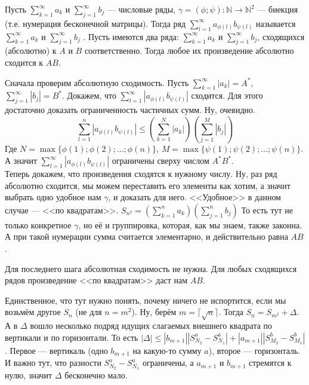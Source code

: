 \documentclass{article}
\begin{document}
\begin{itemize}
\begin{Comment}
        \end{Comment}
        \dfn Пусть $\sum\limits_{k=1}^\infty a_k$ и $\sum\limits_{j=1}^\infty b_j$ --- числовые ряды, $\gamma=(\phi;\psi)\colon\mathbb N\to\mathbb N^2$ --- биекция (т.е. нумерация бесконечной матрицы). Тогда ряд $\sum\limits_{l=1}^\infty a_{\phi(l)}b_{\psi(l)}$ называется  $\sum\limits_{k=1}^\infty a_k$ и $\sum\limits_{j=1}^\infty b_j$
        \thm {}. Пусть имеются два ряда: $\sum\limits_{k=1}^\infty a_k$ и $\sum\limits_{j=1}^\infty b_j$, сходящихся (абсолютно) к $A$ и $B$ соответственно. Тогда любое их произведение абсолютно сходится к $AB$.
        \begin{Proof}
            Сначала проверим абсолютную сходимость. Пусть $\sum\limits_{k=1}^\infty |a_k|=A^*$, $\sum\limits_{j=1}^\infty |b_j|=B^*$. Докажем, что $\sum\limits_{l=1}^\infty|a_{\phi(l)}b_{\psi(l)}|$ сходится. Для этого достаточно доказать ограниченность частичных сумм. Ну, очевидно.
            $$
            \sum\limits_{l=1}^n|a_{\phi(l)}b_{\psi(l)}|\leqslant\left(\sum\limits_{k=1}^N|a_k|\right)\left(\sum\limits_{j=1}^M|b_j|\right)
            $$
            Где $N=\max\{\phi(1);\phi(2);\ldots;\phi(n)\}$, $M=\max\{\psi(1);\psi(2);\ldots;\psi(n)\}$. А значит $\sum\limits_{l=1}^\infty|a_{\phi(l)}b_{\psi(l)}|$ ограничены сверху числом $A^*B^*$.\\
            Теперь докажем, что произведения сходятся к нужному числу. Ну, раз ряд абсолютно сходится, мы можем переставить его элементы как хотим, а значит выбрать одно удобное нам $\gamma$, и доказать для него. <<Удобное>> в данном случае --- <<по квадратам>>. $S_{n^2}=\left(\sum\limits_{k=1}^na_k\right)\left(\sum\limits_{j=1}^nb_j\right)$ То есть тут не только конкретное $\gamma$, но её и группировка, которая, как мы знаем, также законна. А при такой нумерации сумма считается элементарно, и действительно равна $AB$.
        \end{Proof}
        \thm Для последнего шага абсолютная сходимость не нужна. Для любых сходящихся рядов произведение <<по квадратам>> даст нам $AB$.
        \begin{Proof}
            Единственное, что тут нужно понять, почему ничего не испортится, если мы возьмём другое $S_n$ (не для $n=m^2$). Ну, берём $m=\lceil\sqrt{n}\rceil$. Тогда $S_n=S_{m^2}+\Delta$. А в $\Delta$ вошло несколько подряд идущих слагаемых внешнего квадрата по вертикали и по горизонтали. То есть $|\Delta|\leqslant|b_{m+1}|\left|S^a_{N_2}-S^a_{N_1}\right|+|a_{m+1}|\left|S^b_{M_2}-S^b_{M_1}\right|$. Первое --- вертикаль (одно $b_{m+1}$ на какую-то сумму $a$), второе --- горизонталь. И важно тут, что разности $S^a_{N_2}-S^a_{N_1}$ ограничены, а $a_{m+1}$ и $b_{m+1}$ стремятся к нулю, значит $\Delta$ бесконечно мало.

\end{Proof}
\end{itemize}
\end{document}
